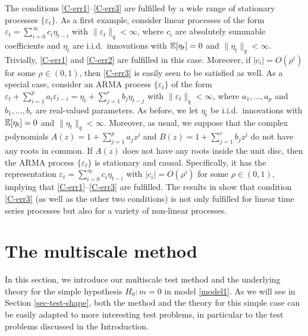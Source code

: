 The conditions \ref{C-err1}--\ref{C-err3} are fulfilled by a wide range of stationary processes $\{\varepsilon_t\}$. As a first example, consider linear processes of the form $\varepsilon_t = \sum\nolimits_{i=0}^{\infty} c_i \eta_{t-i}$ with $\| \varepsilon_t \|_q < \infty$, where $c_i$ are absolutely summable coefficients and $\eta_t$ are i.i.d.\ innovations with $\mathbb{E}[\eta_t] = 0$ and $\| \eta_t\|_q < \infty$. Trivially, \ref{C-err1} and \ref{C-err2} are fulfilled in this case. Moreover, if $|c_i| = O(\rho^i)$ for some $\rho \in (0,1)$, then \ref{C-err3} is easily seen to be satisfied as well. As a special case, consider an ARMA process $\{\varepsilon_t\}$ of the form $\varepsilon_t + \sum\nolimits_{i=1}^p a_i \varepsilon_{t-i} = \eta_t + \sum\nolimits_{j=1}^r b_j \eta_{t-j}$  with $\| \varepsilon_t \|_q < \infty$, where $a_1,\ldots,a_p$ and $b_1,\ldots,b_r$ are real-valued parameters. As before, we let $\eta_t$ be i.i.d.\ innovations with $\mathbb{E}[\eta_t] = 0$ and $\| \eta_t\|_q < \infty$. Moreover, as usual, we suppose that the complex polynomials $A(z) = 1 + \sum\nolimits_{j=1}^p a_jz^j$ and $B(z) = 1 + \sum\nolimits_{j=1}^r b_jz^j$ do not have any roots in common. If $A(z)$ does not have any roots inside the unit disc, then the ARMA process $\{ \varepsilon_t \}$ is stationary and causal. Specifically, it has the representation $\varepsilon_t = \sum\nolimits_{i=0}^{\infty} c_i \eta_{t-i}$ with $|c_i| = O(\rho^i)$ for some $\rho \in (0,1)$, implying that \ref{C-err1}--\ref{C-err3} are fulfilled. The results in \cite{WuShao2004} show that condition \ref{C-err3} (as well as the other two conditions) is not only fulfilled for linear time series processes but also for a variety of non-linear processes. 





\section{The multiscale method}\label{sec-method}


In this section, we introduce our multiscale test method and the underlying theory for the simple hypothesis $H_0: m = 0$ in model \eqref{model1}. As we will see in Section \ref{sec-test-shape}, both the method and the theory for this simple case can be easily adapted to more interesting test problems, in particular to the test problems discussed in the Introduction. 


